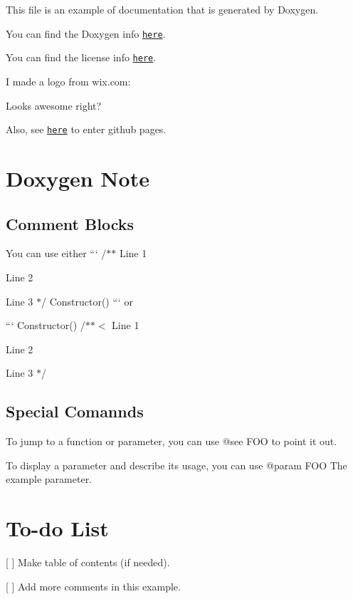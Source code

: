 This file is an example of documentation that is generated by Doxygen.

You can find the Doxygen info \href{http://www.stack.nl/~dimitri/doxygen/index.html}{\tt here}.

You can find the license info \href{https://choosealicense.com/}{\tt here}.

I made a logo from wix.\+com\+:



Looks awesome right?

Also, see \href{https://chao8219.github.io/Doxygen_Example/}{\tt here} to enter github pages.

\section*{Doxygen Note}

\subsection*{Comment Blocks}


\begin{DoxyEnumerate}
\item You can use either ``` /$\ast$$\ast$ Line 1
\begin{DoxyItemize}
\item Line 2
\item Line 3 $\ast$/ Constructor() ``` or
\end{DoxyItemize}

``` Constructor() /$\ast$$\ast$$<$ Line 1
\begin{DoxyItemize}
\item Line 2
\item Line 3 $\ast$/
\end{DoxyItemize}
\end{DoxyEnumerate}

\subsection*{Special Comannds}


\begin{DoxyEnumerate}
\item To jump to a function or parameter, you can use {\ttfamily @see F\+OO} to point it out.
\item To display a parameter and describe its usage, you can use {\ttfamily @param F\+OO The example parameter.}
\end{DoxyEnumerate}

\section*{To-\/do List}


\begin{DoxyItemize}
\item \mbox{[} \mbox{]} Make table of contents (if needed).
\item \mbox{[} \mbox{]} Add more comments in this example. 
\end{DoxyItemize}